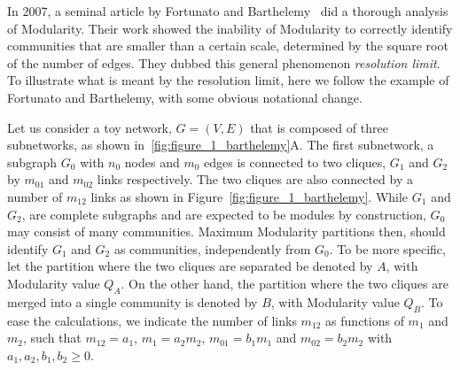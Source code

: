 In 2007, a seminal article by Fortunato and Barthelemy~\cite{fortunato2007} did a thorough analysis of Modularity.
Their work showed the inability of Modularity to correctly identify communities that are smaller than a certain scale, determined by the square root of the number of edges. They dubbed this general phenomenon \emph{resolution limit}.
To illustrate what is meant by the resolution limit, here we follow the example of Fortunato and Barthelemy, with some obvious notational change.

Let us consider a toy network, $G=(V, E)$ that is composed of three subnetworks, as shown in~\ref{fig:figure_1_barthelemy}A.
The first subnetwork, a subgraph $G_0$ with $n_0$ nodes and $m_0$ edges is connected to two cliques, $G_1$ and $G_2$ by $m_{01}$ and $m_{02}$ links respectively. The two cliques are also connected by a number of $m_{12}$ links as shown in Figure~\ref{fig:figure_1_barthelemy}.
While $G_1$ and $G_2$, are complete subgraphs and are expected to be modules by construction, $G_0$ may consist of many communities. Maximum Modularity partitions then, should identify $G_1$ and $G_2$ as communities, independently from $G_0$.
To be more specific, let the partition where the two cliques are separated be denoted by $A$, with Modularity value $Q_A$. On the other hand, the partition where the two cliques are merged into a single community is denoted by $B$, with Modularity value $Q_B$.
To ease the calculations, we indicate the number of links $m_{12}$ as functions of $m_1$ and $m_2$, such that $m_{12}=a_{1}$, $m_1=a_2 m_2$, $m_{01}=b_1 m_1$ and $m_{02}=b_2 m_2$ with $a_1,a_2,b_1,b_2 \geq 0$.

